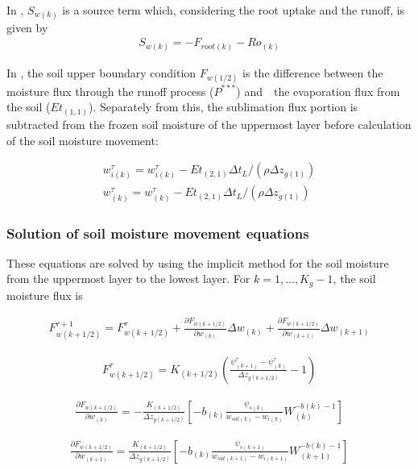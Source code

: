 In \hyperref[eq299]{}, \(S_{w(k)}\) is a source term which, considering the root uptake and the runoff, is given by \begin{eqnarray}
 S_{w(k)} = - F_{root(k)} - Ro_{(k)}
\end{eqnarray}

In \hyperref[eq300]{}, the soil upper boundary condition \(F_{w(1/2)}\) is the difference between the moisture flux through the runoff process (\(P^{*** }\)) and　the evaporation flux from the soil
(\(Et_{(1,1)}\)). Separately from this, the sublimation flux portion is subtracted from the frozen soil moisture of the uppermost layer before calculation of the soil moisture movement:

\begin{eqnarray}
 w_{i(k)}^{\tau} = w_{i(k)}^{\tau} - Et_{(2,1)} \Delta t_L /(\rho \Delta z_{g(1)})\\
 w_{(k)}^{\tau} = w_{(k)}^{\tau} - Et_{(2,1)} \Delta t_L /(\rho \Delta z_{g(1)})
\end{eqnarray}

\subsubsection{Solution of soil moisture movement equations}\label{solution-of-soil-moisture-movement-equations}

These equations are solved by using the implicit method for the soil moisture from the uppermost layer to the lowest layer. For \(k=1,\ldots,K_g-1\), the soil moisture flux is

\begin{eqnarray}
  F_{w(k+1/2)}^{\tau+1} = F_{w(k+1/2)}^{\tau}
+\frac{\partial {F}_{w(k+1/2)}}{\partial w_{(k)}}
 \Delta w_{(k)}
+\frac{\partial {F}_{w(k+1/2)}}{\partial w_{(k+1)}}
 \Delta w_{(k+1)}
\end{eqnarray}

\begin{eqnarray}
  F_{w(k+1/2)}^{\tau} =
K_{(k+1/2)} \left(\frac{\psi_{(k+1)}^{\tau} - \psi_{(k)}^{\tau}}{\Delta z_{g(k+1/2)}} - 1 \right)
\end{eqnarray}

\begin{eqnarray}
 \frac{\partial {F}_{w(k+1/2)}}{\partial w_{(k)}} =
- \frac{K_{(k+1/2)}}{\Delta z_{g(k+1/2)}}
\left[
-b_{(k)} \frac{\psi_{s(k)}}{w_{sat(k)}-w_{i(k)}}W_{(k)}^{-b(k)-1}
\right]
\end{eqnarray}

\begin{eqnarray}
 \frac{\partial {F}_{w(k+1/2)}}{\partial w_{(k+1)}} =
 \frac{K_{(k+1/2)}}{\Delta z_{g(k+1/2)}}
\left[
-b_{(k)} \frac{\psi_{s(k+1)}}{w_{sat(k+1)}-w_{i(k+1)}}W_{(k+1)}^{-b(k)-1}
\right]
\end{eqnarray}


